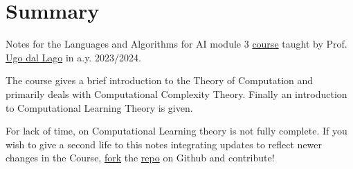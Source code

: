 \chapter*{Summary}
\label{ch:summary}

\vspace*{-1cm}
Notes for the Languages and Algorithms for AI module 3 \href{https://www.unibo.it/en/study/phd-professional-masters-specialisation-schools-and-other-programmes/course-unit-catalogue/course-unit/2023/446595}{course} taught by Prof. \href{https://www.unibo.it/sitoweb/ugo.dallago/en}{Ugo dal Lago} in a.y. 2023/2024.

\bigskip
The course gives a brief introduction to the Theory of Computation and primarily deals with Computational Complexity Theory. Finally an introduction to Computational Learning Theory is given.

\bigskip
For lack of time, \chapref{\ref{ch:computational-learning}} on Computational Learning theory is not fully complete.
If you wish to give a second life to this notes integrating updates to reflect newer changes in the Course, \href{https://docs.github.com/en/pull-requests/collaborating-with-pull-requests/working-with-forks/fork-a-repo}{fork} the \href{https://github.com/niccolozanotti/laai3}{repo} on Github and contribute!